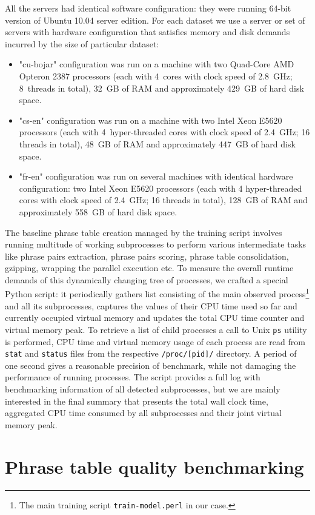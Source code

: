 All the servers had identical software configuration:
they were running 64-bit version of Ubuntu 10.04 server edition.
For each dataset we use a server or set of servers with hardware configuration
that satisfies memory and disk demands incurred by the size of particular dataset:
\begin{itemize}
  \item "cu-bojar" configuration was run on a machine with two Quad-Core
  AMD Opteron\texttrademark{} 2387 processors (each with 4~cores with clock speed
  of 2.8~GHz; 8~threads in total),
  32~GB of RAM and approximately 429~GB of hard disk space. %
  \item "cs-en" configuration was run on a machine with two Intel\textregistered{}
  Xeon\textregistered{} E5620 processors (each with 4~hyper-threaded cores with
  clock speed of 2.4~GHz; 16 threads in total),
  48~GB of RAM and approximately 447~GB of hard disk space. %
  \item "fr-en" configuration was run on several machines with identical hardware
  configuration: two Intel\textregistered{} Xeon\textregistered{} E5620 processors
  (each with 4 hyper-threaded cores with clock speed of 2.4~GHz; 16 threads in total),
  128~GB of RAM and approximately 558~GB of hard disk space. %
\end{itemize}



The baseline phrase table creation managed by the training script involves
running multitude of working subprocesses to perform various intermediate
tasks like phrase pairs extraction, phrase pairs scoring, phrase table
consolidation, gzipping, wrapping the parallel execution etc.
To measure the overall runtime demands of this dynamically changing tree
of processes, we crafted a special Python script:
it periodically gathers list consisting of the main observed process\footnote{The main training script \texttt{train-model.perl} in our case.}
and all its subprocesses, captures the values of their CPU time used so far
and currently occupied virtual memory and updates the total CPU time counter
and virtual memory peak.
To retrieve a list of child processes a call to Unix \verb|ps| utility is
performed, CPU time and virtual memory usage of each process are read from
\verb|stat| and \verb|status| files from the respective \verb|/proc/[pid]/|
directory.
A period of one second gives a reasonable precision of benchmark, while
not damaging the performance of running processes.
The script provides a full log with benchmarking information of all detected
subprocesses, but we are mainly interested in the final summary that presents
the total wall clock time, aggregated CPU time consumed by all subprocesses
and their joint virtual memory peak.

\section{Phrase table quality benchmarking}

